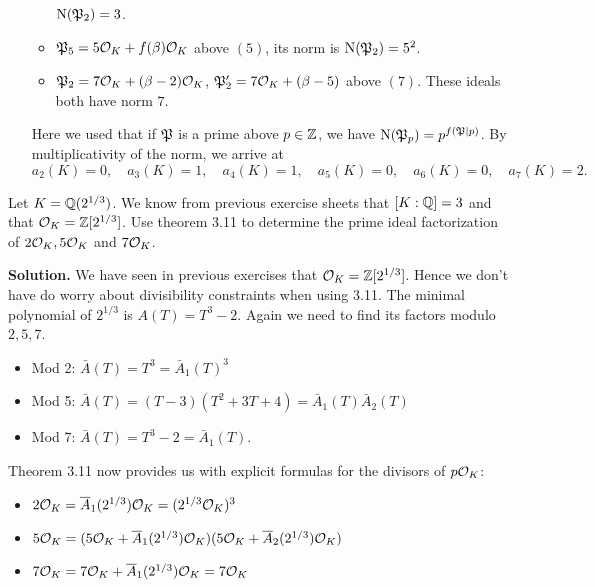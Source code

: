 \documentclass[a4paper,11pt]{article}
\begin{document}
\begin{enumerate}[labelindent=0pt, wide]
\begin{itemize}
                $\operatorname{N}(\mathfrak{P}_2) = 3$.
            \item $\mathfrak{P}_5 = 5 \mathcal{O}_K + f(\beta) \mathcal{O}_K$ above $(5)$, its norm is 
                $\operatorname{N}(\mathfrak{P}_2) = 5^2$.
            \item $\mathfrak{P}_2 = 7 \mathcal{O}_K + (\beta-2) \mathcal{O}_K$, $\mathfrak{P}_2' = 
                7 \mathcal{O}_K + (\beta-5)$ above $(7)$. These ideals both have norm
                $7$.
        \end{itemize}
        Here we used that if $\mathfrak{P}$ is a prime above $p \in \mathbb{Z}$, 
        we have $\operatorname{N}(\mathfrak{P}_p) = p^{f(\mathfrak{P}|p)}$.
        By multiplicativity of the norm, we arrive at
        \begin{equation*}
            a_2(K) = 0, \quad
            a_3(K) = 1, \quad
            a_4(K) = 1, \quad
            a_5(K) = 0, \quad
            a_6(K) = 0, \quad
            a_7(K) = 2.
        \end{equation*}
\end{enumerate}

Let $K=\mathbb{Q}(2^{1/3})$. We know from previous exercise sheets that $[K:\mathbb{Q}] = 3$
and that $\mathcal{O}_K = \mathbb{Z}[2^{1/3}]$. Use theorem 3.11 to determine the prime ideal
factorization of $2 \mathcal{O}_K, 5\mathcal{O}_K$ and $7\mathcal{O}_K$.

\textbf{Solution.} We have seen in previous exercises that 
$\mathcal{O}_K = \mathbb{Z}[2^{1/3}]$. Hence we don't have do worry about divisibility
constraints when using 3.11. The minimal polynomial of $2^{1/3}$ is 
$A(T) = T^3 - 2$. Again we need to find its factors modulo $2,5, 7$. 
\begin{itemize}
    \item Mod 2: $\bar A(T) = T^3 = \bar A_1(T)^3$
    \item Mod 5: $\bar A(T) = (T-3)(T^2+3T+4) = \bar A_1(T) \bar A_2(T)$
    \item Mod 7: $\bar A(T) = T^3 - 2 = \bar A_1(T)$. 
\end{itemize}
Theorem 3.11 now provides us with explicit formulas for the divisors of 
$p \mathcal{O}_K$:
\begin{itemize}
    \item $2\mathcal{O}_K = \overline A_1(2^{1/3})\mathcal{O}_K = (2^{1/3}\mathcal{O}_K)^3$
    \item $5\mathcal{O}_K = (5\mathcal{O}_K + \overline A_1(2^{1/3})\mathcal{O}_K)(5 \mathcal{O}_K + \overline
        A_2(2^{1/3})\mathcal{O}_K)$
    \item $7\mathcal{O}_K = 7 \mathcal{O}_K + \overline A_1(2^{1/3})\mathcal{O}_K = 7\mathcal{O}_K$
\end{itemize}
\end{document}
